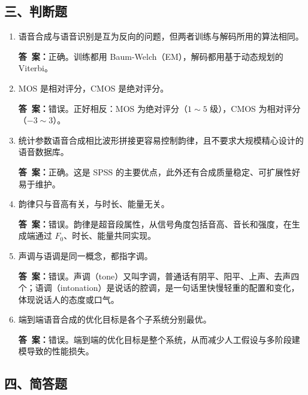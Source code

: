 \documentclass[10.5pt]{ctexart}
\newenvironment{qlist}
  {\begin{enumerate}[label={\sffamily\bfseries\color{accent}\arabic*.},leftmargin=2.4em,labelsep=0.55em,itemsep=0.62em,topsep=0.15em,parsep=0.3em,partopsep=0pt]}
  {\end{enumerate}}
\newcommand{\anslabel}{{\sffamily\bfseries\color{accent}答\ 案：}\hspace{0.35em}}
\newcommand{\ans}[1]{\par\vspace{2.15\baselineskip}\begin{ansbox}\anslabel #1\end{ansbox}}
\begin{document}
\subsection{三、判断题}

\begin{qlist}

\item 语音合成与语音识别是互为反向的问题，但两者训练与解码所用的算法相同。
\ans{正确。训练都用 Baum-Welch（EM），解码都用基于动态规划的 Viterbi。}

\item MOS 是相对评分，CMOS 是绝对评分。
\ans{错误。正好相反：MOS 为绝对评分（$1\sim 5$ 级），CMOS 为相对评分（$-3\sim 3$）。}

\item 统计参数语音合成相比波形拼接更容易控制韵律，且不要求大规模精心设计的语音数据库。
\ans{正确。这是 SPSS 的主要优点，此外还有合成质量稳定、可扩展性好易于维护。}

\item 韵律只与音高有关，与时长、能量无关。
\ans{错误。韵律是超音段属性，从信号角度包括音高、音长和强度，在生成端通过 $F_0$、时长、能量共同实现。}

\item 声调与语调是同一概念，都指字调。
\ans{错误。声调（tone）又叫字调，普通话有阴平、阳平、上声、去声四个；语调（intonation）是说话的腔调，是一句话里快慢轻重的配置和变化，体现说话人的态度或口气。}

\item 端到端语音合成的优化目标是各个子系统分别最优。
\ans{错误。端到端的优化目标是整个系统，从而减少人工假设与多阶段建模导致的性能损失。}

\end{qlist}

\subsection{四、简答题}
\end{document}
